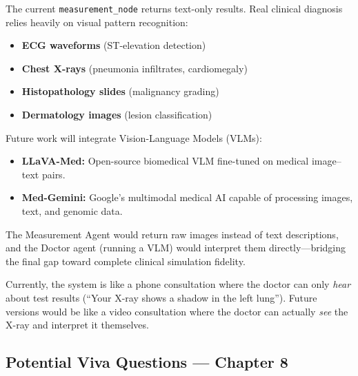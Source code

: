 \begin{acadbox}[\textcolor{white}{Academic Definition}]
The current \texttt{measurement\_node} returns text-only results. Real clinical diagnosis relies heavily on visual pattern recognition:
\begin{itemize}
    \item \textbf{ECG waveforms} (ST-elevation detection)
    \item \textbf{Chest X-rays} (pneumonia infiltrates, cardiomegaly)
    \item \textbf{Histopathology slides} (malignancy grading)
    \item \textbf{Dermatology images} (lesion classification)
\end{itemize}

Future work will integrate Vision-Language Models (VLMs):
\begin{itemize}
    \item \textbf{LLaVA-Med:} Open-source biomedical VLM fine-tuned on medical image--text pairs.
    \item \textbf{Med-Gemini:} Google's multimodal medical AI capable of processing images, text, and genomic data.
\end{itemize}

The Measurement Agent would return raw images instead of text descriptions, and the Doctor agent (running a VLM) would interpret them directly---bridging the final gap toward complete clinical simulation fidelity.
\end{acadbox}

\begin{analogybox}[\textcolor{white}{Simple Analogy}]
Currently, the system is like a phone consultation where the doctor can only \textit{hear} about test results (``Your X-ray shows a shadow in the left lung''). Future versions would be like a video consultation where the doctor can actually \textit{see} the X-ray and interpret it themselves.
\end{analogybox}

\subsection{Potential Viva Questions --- Chapter 8}

